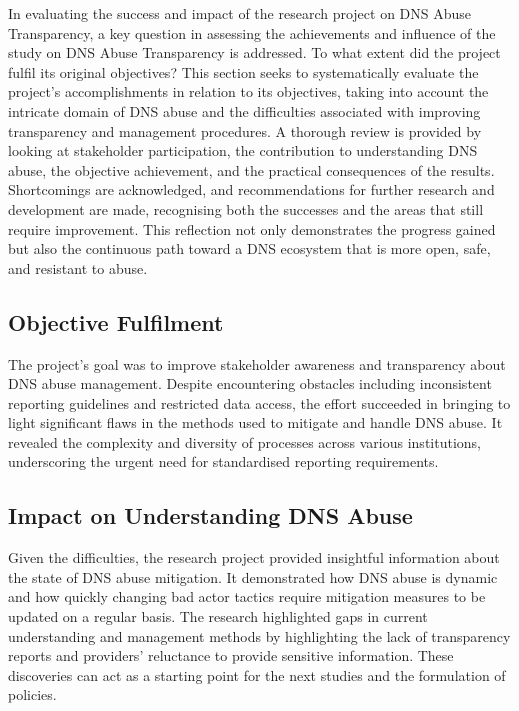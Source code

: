 In evaluating the success and impact of the research project on DNS Abuse Transparency, a key question in assessing the achievements and influence of the study on DNS Abuse Transparency is addressed. To what extent did the project fulfil its original objectives? This section seeks to systematically evaluate the project's accomplishments in relation to its objectives, taking into account the intricate domain of DNS abuse and the difficulties associated with improving transparency and management procedures. A thorough review is provided by looking at stakeholder participation, the contribution to understanding DNS abuse, the objective achievement, and the practical consequences of the results. Shortcomings are acknowledged, and recommendations for further research and development are made, recognising both the successes and the areas that still require improvement. This reflection not only demonstrates the progress gained but also the continuous path toward a DNS ecosystem that is more open, safe, and resistant to abuse.


\subsection{Objective Fulfilment}

The project's goal was to improve stakeholder awareness and transparency about DNS abuse management. Despite encountering obstacles including inconsistent reporting guidelines and restricted data access, the effort succeeded in bringing to light significant flaws in the methods used to mitigate and handle DNS abuse. It revealed the complexity and diversity of processes across various institutions, underscoring the urgent need for standardised reporting requirements.

\subsection{Impact on Understanding DNS Abuse}

Given the difficulties, the research project provided insightful information about the state of DNS abuse mitigation. It demonstrated how DNS abuse is dynamic and how quickly changing bad actor tactics require mitigation measures to be updated on a regular basis. The research highlighted gaps in current understanding and management methods by highlighting the lack of transparency reports and providers' reluctance to provide sensitive information. These discoveries can act as a starting point for the next studies and the formulation of policies.

